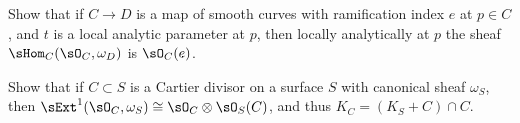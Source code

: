 \begin{exercise}\label{codimension0}
Show that if $C\to D$ is a map of smooth curves with ramification index $e$ at $p\in C$, and $t$ is a local
analytic parameter at $p$, then 
locally analytically at $p$ the sheaf $\sHom_C(\sO_C, \omega_D)$ is $\sO_C(e)$.
\end{exercise}

\begin{exercise}\label{codimension1}
 Show that if $C\subset S$ is a Cartier divisor on a surface $S$ with canonical sheaf $\omega_S$, 
 then $\sExt^1(\sO_C, \omega_S) \cong \sO_C\otimes \sO_S(C)$, and thus $K_C = (K_S+C)\cap C$.
\end{exercise}




